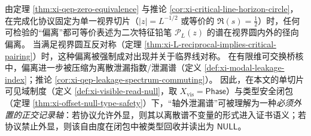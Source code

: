 \begin{remark}\label{rem:xi-qep-leakage-conceptual}
由定理 \ref{thm:xi-qep-zero-equivalence} 与推论 \ref{cor:xi-critical-line-horizon-circle}，在完成化协议固定为单一视界切片（\(|z|=L^{-1/2}\) 或等价的 \(\Re(s)=\tfrac12\)）时，任何可检验的“偏离”都可等价表述为二次特征铅笔 \(\mathcal{P}_L(z)\) 的谱在视界圆内外的径向偏离。
当满足视界圆互反对称（定理 \ref{thm:xi-L-reciprocal-implies-critical-pairing}）时，这种偏离被强制成对出现并关于临界线对称。
在有限维可交换桥核中，偏离进一步被压缩为离散泄漏指数/泄漏谱（定义 \ref{def:xi-modal-leakage-index}；推论 \ref{cor:xi-qep-leakage-spectrum-commuting}）。
因此，在本文的单切片可见域制度（定义 \ref{def:xi-visible-read-null}，取 \(X_{\mathrm{vis}}=\mathsf{Phase}\)）与类型安全闭包（定理 \ref{thm:xi-offset-null-type-safety}）下，“轴外泄漏谱”可被理解为一种\emph{必须外置的正交记录轴}：若协议允许外显，则其以离散谱不变量的形式进入证书语义；若协议禁止外显，则该自由度在闭包中被类型回收并读出为 \(\mathsf{NULL}\)。
\end{remark}

\endinput

